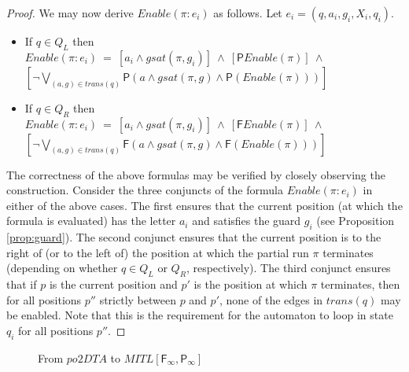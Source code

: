 \documentclass{llncs}
\newcommand{\fut}{\textsf{F}}
\newcommand{\past}{\textsf{P}}
\newcommand{\potdta}{\mbox{$\mathit{po2DTA}$}}
\newcommand{\mitlfpinf}{\mbox{$\mathit{MITL[\fut_\infty,\past_\infty]}$}}
\newcommand{\tab}{\hspace*{1cm}}
\begin{document}
\begin{proof}
We may now derive $\mathit{Enable}(\pi:e_i)$ as follows. Let $e_i=(q,a_i,g_i,X_i,q_i)$.\\
\begin{itemize}
\item If $q \in Q_L$ then\\
$\mathit{Enable(\pi:e_i)} ~=~ [a_i \land gsat(\pi,g_i)]~ \land ~ [\past\mathit{Enable(\pi)}] ~\land ~$ \\
\tab \tab $[\neg\bigvee\limits_{(a,g)\in trans(q)} \past(a\land gsat(\pi,g) \land \past(\mathit{Enable}(\pi)))]$
\item If $q \in Q_R$ then\\
$\mathit{Enable(\pi:e_i)} ~=~ [a_i \land gsat(\pi,g_i)]~ \land ~ [\fut\mathit{Enable(\pi)}] ~\land ~ $\\
\tab \tab $[\neg\bigvee\limits_{(a,g)\in trans(q)} \fut(a\land gsat(\pi,g) \land \fut(\mathit{Enable}(\pi)))]$
\end{itemize}
The correctness of the above formulas may be verified by closely observing the construction. Consider the three conjuncts of the formula $\mathit{Enable}(\pi:e_i)$ in either of the above cases. The first ensures that the current position (at which the formula is evaluated) has the letter $a_i$ and satisfies the guard $g_i$ (see Proposition \ref{prop:guard}). The second conjunct ensures that the current position is to the right of (or to the left of) the position at which the partial run $\pi$ terminates (depending on whether $q \in Q_L$ or $Q_R$, respectively). The third conjunct ensures that if $p$ is the current position and $p'$ is the position at which $\pi$ terminates, then for all positions $p''$ strictly between $p$ and $p'$, none of the edges in $trans(q)$ may be enabled. Note that this is the requirement for the automaton to loop in state $q_i$ for all positions $p''$.
\end{proof}

\begin{figure}
\begin{center}
\caption{From \potdta\/ to \mitlfpinf}
\label{fig:autm2form}
\end{center}
\end{figure}
\end{document}
